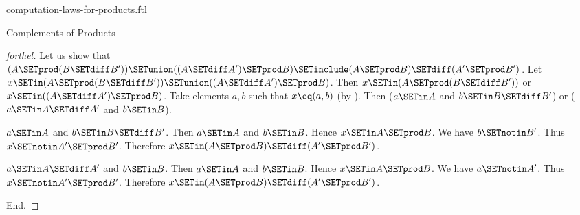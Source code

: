 \documentclass{naproche-library}
\begin{document}
\begin{smodule}[title=Computation Laws for Cartesian Products]{computation-laws-for-products.ftl}
\begin{sfragment}{Complements of Products}
\begin{proof}[forthel]
    Let us show that $(A \SETprod (B \SETdiff B')) \SETunion ((A \SETdiff A') \SETprod B) \SETinclude (A \SETprod B) \SETdiff (A' \SETprod B')$.
      Let $x \SETin (A \SETprod (B \SETdiff B')) \SETunion ((A \SETdiff A') \SETprod B)$.
      Then $x \SETin (A \SETprod (B \SETdiff B'))$ or $x \SETin ((A \SETdiff A') \SETprod B)$.
      Take elements $a,b$ such that $x \eq (a, b)$ (by ).
      Then ($a \SETin A$ and $b \SETin B \SETdiff B'$) or ($a \SETin A \SETdiff A'$ and $b \SETin B$).

      \begin{case}{$a \SETin A$ and $b \SETin B \SETdiff B'$.}
        Then $a \SETin A$ and $b \SETin B$.
        Hence $x \SETin A \SETprod B$.
        We have $b \SETnotin B'$.
        Thus $x \SETnotin A' \SETprod B'$.
        Therefore $x \SETin (A \SETprod B) \SETdiff (A' \SETprod B')$.
      \end{case}

      \begin{case}{$a \SETin A \SETdiff A'$ and $b \SETin B$.}
        Then $a \SETin A$ and $b \SETin B$.
        Hence $x \SETin A \SETprod B$.
        We have $a \SETnotin A'$.
        Thus $x \SETnotin A' \SETprod B'$.
        Therefore $x \SETin (A \SETprod B) \SETdiff (A' \SETprod B')$.
      \end{case}
    End.
  \end{proof}
\end{sfragment}
\end{smodule}
\end{document}
